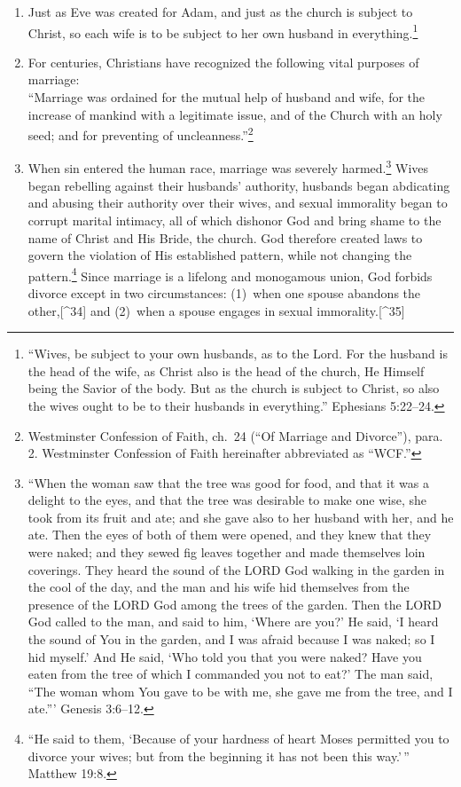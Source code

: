 \documentclass[
]{book}
\begin{document}
\begin{enumerate}
\item
  Just as Eve was created for Adam, and just as the church is subject to Christ, so each wife is to be subject to her own husband in everything.\footnote{``Wives, be subject to your own husbands, as to the Lord. For the husband is the head of the wife, as Christ also is the head of the church, He Himself being the Savior of the body. But as the church is subject to Christ, so also the wives ought to be to their husbands in everything.'' Ephesians 5:22--24.}
\item
  For centuries, Christians have recognized the following vital purposes of marriage:\\
  ``Marriage was ordained for the mutual help of husband and wife, for the increase of mankind with a legitimate issue, and of the Church with an holy seed; and for preventing of uncleanness.''\footnote{Westminster Confession of Faith, ch.~24 (``Of Marriage and Divorce''), para. 2. Westminster Confession of Faith hereinafter abbreviated as ``WCF.''}
\item
  When sin entered the human race, marriage was severely harmed.\footnote{``When the woman saw that the tree was good for food, and that it was a delight to the eyes, and that the tree was desirable to make one wise, she took from its fruit and ate; and she gave also to her husband with her, and he ate. Then the eyes of both of them were opened, and they knew that they were naked; and they sewed fig leaves together and made themselves loin coverings. They heard the sound of the LORD God walking in the garden in the cool of the day, and the man and his wife hid themselves from the presence of the LORD God among the trees of the garden. Then the LORD God called to the man, and said to him, `Where are you?' He said, `I heard the sound of You in the garden, and I was afraid because I was naked; so I hid myself.' And He said, `Who told you that you were naked? Have you eaten from the tree of which I commanded you not to eat?' The man said, ``The woman whom You gave to be with me, she gave me from the tree, and I ate.''' Genesis 3:6--12.} Wives began rebelling against their husbands' authority, husbands began abdicating and abusing their authority over their wives, and sexual immorality began to corrupt marital intimacy, all of which dishonor God and bring shame to the name of Christ and His Bride, the church. God therefore created laws to govern the violation of His established pattern, while not changing the pattern.\footnote{``He said to them, `Because of your hardness of heart Moses permitted you to divorce your wives; but from the beginning it has not been this way.'\,'' Matthew 19:8.} Since marriage is a lifelong and monogamous union, God forbids divorce except in two circumstances: (1)~when one spouse abandons the other,{[}\^{}34{]} and (2)~when a spouse engages in sexual immorality.{[}\^{}35{]}

\end{enumerate}
\end{document}
